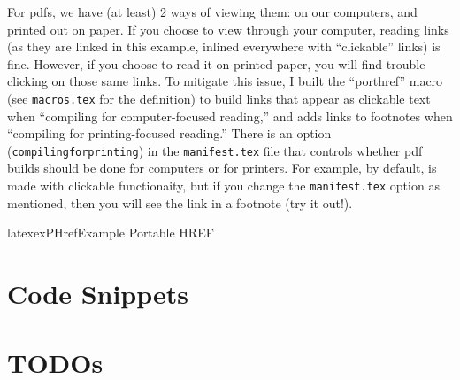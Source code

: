 For \acsp{pdf}, we have (at least) 2 ways of viewing them: on our computers, and
printed out on paper. If you choose to view through your computer, reading links
(as they are linked in this example, inlined everywhere with ``clickable''
links) is fine. However, if you choose to read it on printed paper, you will
find trouble clicking on those same links. To mitigate this issue, I built the
``porthref'' macro (see \texttt{macros.tex} for the definition) to build links
that appear as clickable text when ``compiling for computer-focused reading,''
and adds links to footnotes when ``compiling for printing-focused reading.''
There is an option (\texttt{compilingforprinting}) in the \texttt{manifest.tex}
file that controls whether \acs{pdf} builds should be done for computers or for
printers. For example, by default, 
is made with clickable functionaity, but if you change the \texttt{manifest.tex}
option as mentioned, then you will see the link in a footnote (try it out!).


\begin{pseudocode}{latex}{exPHref}{Example Portable HREF}
\end{pseudocode}

\section{Code Snippets}
\label{chap:extras:sec:code-snippets}

\section{TODOs}
\label{chap:extras:sec:todos}
